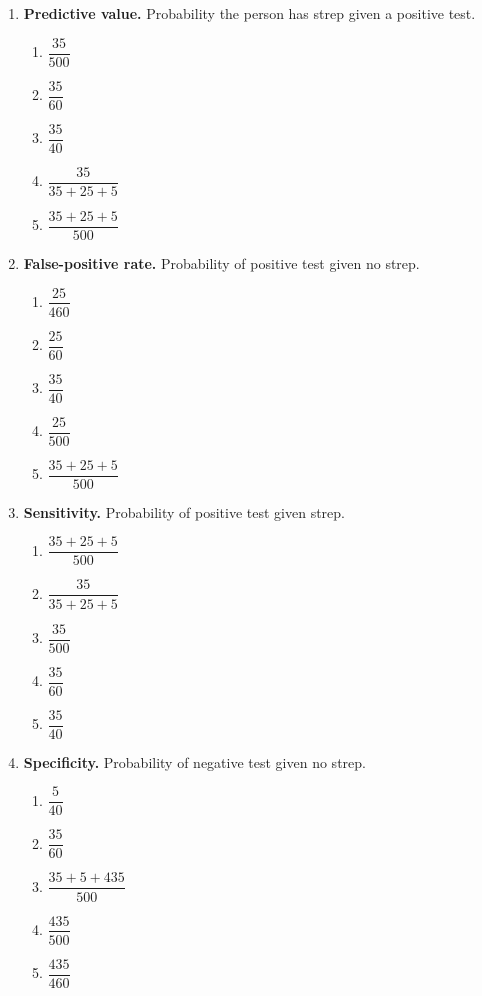 \begin{enumerate}[label=\textbf{S\arabic*.}]

\item \textbf{Predictive value.} Probability the person has strep given a positive test. 
\begin{enumerate}[label=(\Alph*)]
\item $\dfrac{35}{500}$
\item $\dfrac{35}{60}$
\item $\dfrac{35}{40}$
\item $\dfrac{35}{35+25+5}$
\item $\dfrac{35+25+5}{500}$
\end{enumerate}

\item \textbf{False-positive rate.} Probability of positive test given no strep. 
\begin{enumerate}[label=(\Alph*)]
\item $\dfrac{25}{460}$
\item $\dfrac{25}{60}$
\item $\dfrac{35}{40}$
\item $\dfrac{25}{500}$
\item $\dfrac{35+25+5}{500}$
\end{enumerate}

\item \textbf{Sensitivity.} Probability of positive test given strep. 
\begin{enumerate}[label=(\Alph*)]
\item $\dfrac{35+25+5}{500}$
\item $\dfrac{35}{35+25+5}$
\item $\dfrac{35}{500}$
\item $\dfrac{35}{60}$
\item $\dfrac{35}{40}$
\end{enumerate}

\item \textbf{Specificity.} Probability of negative test given no strep. 
\begin{enumerate}[label=(\Alph*)]
\item $\dfrac{5}{40}$
\item $\dfrac{35}{60}$
\item $\dfrac{35+5+435}{500}$
\item $\dfrac{435}{500}$
\item $\dfrac{435}{460}$
\end{enumerate}

\end{enumerate}





    









